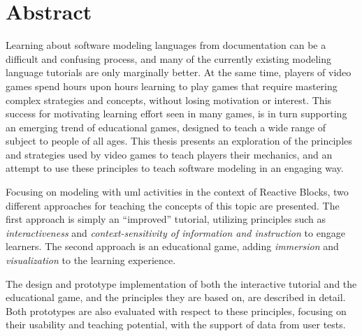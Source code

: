 \chapter*{Abstract}
Learning about software modeling languages from documentation can be a difficult and confusing process, and many of the currently existing modeling language tutorials are only marginally better. At the same time, players of video games spend hours upon hours learning to play games that require mastering complex strategies and concepts, without losing motivation or interest. This success for motivating learning effort seen in many games, is in turn supporting an emerging trend of educational games, designed to teach a wide range of subject to people of all ages. This thesis presents an exploration of the principles and strategies used by video games to teach players their mechanics, and an attempt to use these principles to teach software modeling in an engaging way.

\noindent
Focusing on modeling with \gls{uml} activities in the context of Reactive Blocks, two different approaches for teaching the concepts of this topic are presented. The first approach is simply an ``improved'' tutorial, utilizing principles such as \emph{interactiveness} and \emph{context-sensitivity of information and instruction} to engage learners. The second approach is an educational game, adding \emph{immersion} and \emph{visualization} to the learning experience.

\noindent
The design and prototype implementation of both the interactive tutorial and the educational game, and the principles they are based on, are described in detail. Both prototypes are also evaluated with respect to these principles, focusing on their usability and teaching potential, with the support of data from user tests.
